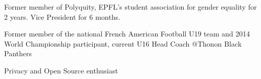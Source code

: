 


\begin{cventries}
	
	
	\cventry
	{} %
	{}
	{}
	{}
	{ %
		\begin{cvitems}
			\item {Former member of Polyquity, EPFL's student association for gender equality for 2 years. Vice President for 6 months.}
			\item {Former member of the national French American Football U19 team and 2014 World Championship participant, current U16 Head Coach @Thonon Black Panthers}
			\item {Privacy and Open Source enthusiast}
		\end{cvitems}
	}
	
	
	
	
\end{cventries}